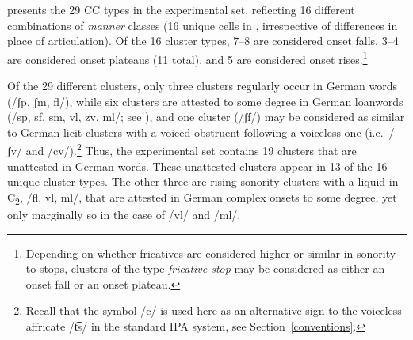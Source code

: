 \begin{table}
\caption{\label{tab:targetlist}Experimental stimulus set: CC types. Legend: {S−} = voiceless stops; {F−} = voiceless fricatives; {F+} = voiced fricatives; {N} = nasals; {L} = liquids; cor = coronal; lab = labial; * = voicing disagreement between obstruents; ** = no labial liquid; *** = dorsal stop /k/ (see list in Section~\ref{sec:stimChoice}).}
\end{table}

 presents the 29 CC types in the experimental set, reflecting 16 different combinations of \emph{manner} classes (16 unique cells in , irrespective of differences in place of articulation). Of the 16 cluster types, 7--8 are considered onset falls, 3--4 are considered onset plateaus (11 total), and 5 are considered onset rises.\footnote{Depending on whether fricatives are considered higher or similar in sonority to stops, clusters of the type \emph{fricative-stop} may be considered as either an onset fall or an onset plateau.} 

Of the 29 different clusters, only three clusters regularly occur in German words (/ʃp, ʃm, fl/), while six clusters are attested to some degree in German loanwords (/sp, sf, sm, vl, zv, ml/; see \citealt{van2012sonority}),
and one cluster (/ʃf/) may be considered as similar to German licit clusters with a voiced obstruent following a voiceless one (i.e.~/ʃv/ and /cv/).\footnote{Recall that the symbol /c/ is used here as an alternative sign to the voiceless affricate /t͡s/ in the standard IPA system, see Section~\ref{conventions}.}
Thus, the experimental set contains 19 clusters that are unattested in German words. These unattested clusters appear in 13 of the 16 unique cluster types. 
The other three are rising sonority clusters with a liquid in C\textsubscript{2}, /fl, vl, ml/, that are attested in German complex onsets to some degree, yet only marginally so in the case of /vl/ and /ml/.

